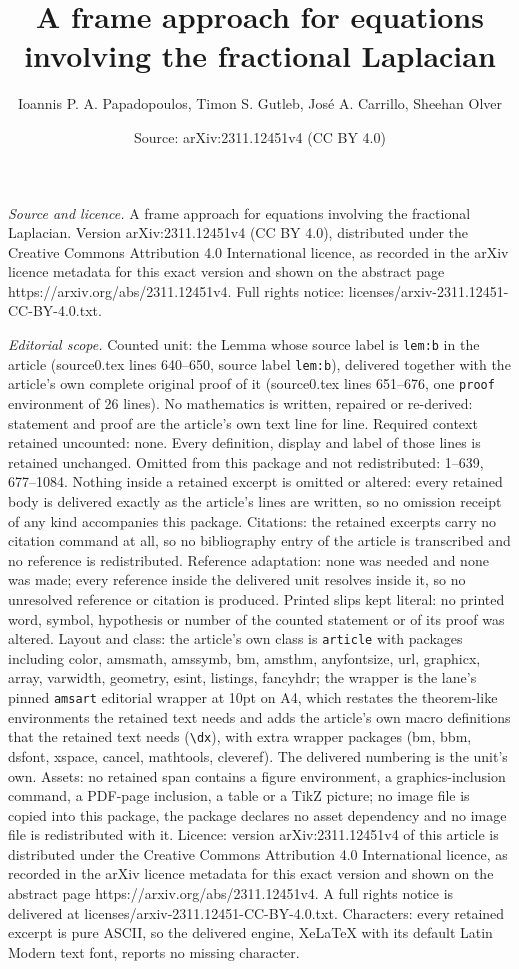 \documentclass[10pt,a4paper]{amsart}
\title[A frame approach for equations involving the fractional Lapl]{A frame approach for equations involving the fractional Laplacian}
\author{Ioannis P. A. Papadopoulos, Timon S. Gutleb, Jos\'e A. Carrillo, Sheehan Olver}
\date{Source: arXiv:2311.12451v4 (CC BY 4.0)}
\begin{document}
\maketitle

\noindent\emph{Source and licence.} A frame approach for equations involving the fractional Laplacian. Version arXiv:2311.12451v4 (CC BY 4.0), distributed under the Creative Commons Attribution 4.0 International licence, as recorded in the arXiv licence metadata for this exact version and shown on the abstract page https://arxiv.org/abs/2311.12451v4. Full rights notice: licenses/arxiv-2311.12451-CC-BY-4.0.txt.\par\smallskip

\noindent\textit{Editorial scope.} Counted unit: the Lemma whose source label is \texttt{lem:b} in the article (source0.tex lines 640--650, source label \texttt{lem:b}), delivered together with the article's own complete original proof of it (source0.tex lines 651--676, one \texttt{proof} environment of 26 lines). No mathematics is written, repaired or re-derived: statement and proof are the article's own text line for line. Required context retained uncounted: none. Every definition, display and label of those lines is retained unchanged. Omitted from this package and not redistributed: 1--639, 677--1084. Nothing inside a retained excerpt is omitted or altered: every retained body is delivered exactly as the article's lines are written, so no omission receipt of any kind accompanies this package. Citations: the retained excerpts carry no citation command at all, so no bibliography entry of the article is transcribed and no reference is redistributed. Reference adaptation: none was needed and none was made; every reference inside the delivered unit resolves inside it, so no unresolved reference or citation is produced. Printed slips kept literal: no printed word, symbol, hypothesis or number of the counted statement or of its proof was altered. Layout and class: the article's own class is \texttt{article} with packages including color, amsmath, amssymb, bm, amsthm, anyfontsize, url, graphicx, array, varwidth, geometry, esint, listings, fancyhdr; the wrapper is the lane's pinned \texttt{amsart} editorial wrapper at 10pt on A4, which restates the theorem-like environments the retained text needs and adds the article's own macro definitions that the retained text needs (\texttt{\textbackslash dx}), with extra wrapper packages (bm, bbm, dsfont, xspace, cancel, mathtools, cleveref). The delivered numbering is the unit's own. Assets: no retained span contains a figure environment, a graphics-inclusion command, a PDF-page inclusion, a table or a TikZ picture; no image file is copied into this package, the package declares no asset dependency and no image file is redistributed with it. Licence: version arXiv:2311.12451v4 of this article is distributed under the Creative Commons Attribution 4.0 International licence, as recorded in the arXiv licence metadata for this exact version and shown on the abstract page https://arxiv.org/abs/2311.12451v4. A full rights notice is delivered at licenses/arxiv-2311.12451-CC-BY-4.0.txt. Characters: every retained excerpt is pure ASCII, so the delivered engine, XeLaTeX with its default Latin Modern text font, reports no missing character.
\end{document}
